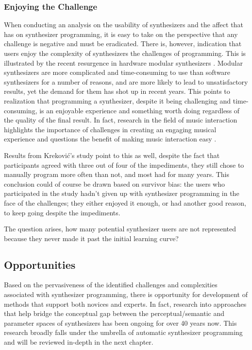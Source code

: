 \subsubsection{Enjoying the Challenge}
When conducting an analysis on the usability of synthesizers and the affect that has on synthesizer programming, it is easy to take on the perspective that any challenge is negative and must be eradicated. There is, however, indication that users enjoy the complexity of synthesizers the challenges of programming. This is illustrated by the recent resurgence in hardware modular synthesizers \cite{bates2021interface}. Modular synthesizers are more complicated and time-consuming to use than software synthesizers for a number of reasons, and are more likely to lead to unsatisfactory results, yet the demand for them has shot up in recent years. This points to realization that programming a synthesizer, despite it being challenging and time-consuming, is an enjoyable experience and something worth doing regardless of the quality of the final result. In fact, research in the field of music interaction \cite{holland2013music} highlights the importance of challenges in creating an engaging musical experience and questions the benefit of making music interaction easy \cite{mcdermott2013should}.

Results from Krekovi\'{c}'s study point to this as well, despite the fact that participants agreed with three out of four of the impediments, they still chose to manually program more often than not, and most had for many years. This conclusion could of course be drawn based on survivor bias: the users who participated in the study hadn't given up with synthesizer programming in the face of the challenges; they either enjoyed it enough, or had another good reason, to keep going despite the impediments. 

The question arises, how many potential synthesizer users are not represented because they never made it past the initial learning curve? 

\subsection{Opportunities}

Based on the pervasiveness of the identified challenges and complexities associated with synthesizer programming, there is opportunity for development of methods that support both novices and experts. In fact, research into approaches that help bridge the conceptual gap between the perceptual/semantic and parameter spaces of synthesizers has been ongoing for over 40 years now. This research broadly falls under the umbrella of automatic synthesizer programming and will be reviewed in-depth in the next chapter.


